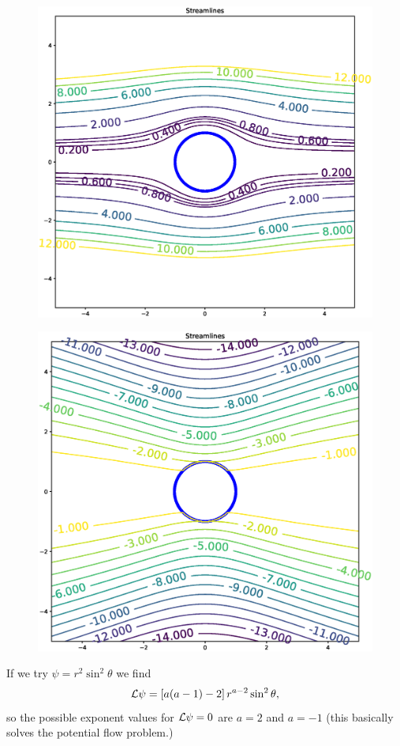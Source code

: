 \begin{figure}
  \centering
  \includegraphics[width=0.8\linewidth]{figures/creeping_flow_past_sphere}
  \caption{\label{fig:creeping_flow_past_sphere}}
\end{figure}


\begin{figure}
  \centering
  \includegraphics[width=0.8\linewidth]{figures/creeping_flow_past_sphere_moving}
  \caption{\label{fig:creeping_flow_past_sphere_moving}}
\end{figure}




If we try $\psi=r^2 \sin^2\theta$ we find
\[
  {\cal L} \psi = \left[ a(a-1) - 2 \right] r^{a-2} \sin^2\theta ,
\]
so the possible exponent values for ${\cal L} \psi = 0$ are $a=2$ and
$a=-1$ (this basically solves the potential flow problem.)

